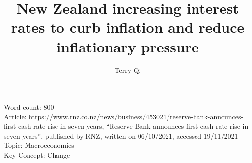 \documentclass[a4paper,12pt]{article}
\title{New Zealand increasing interest rates to curb inflation and reduce inflationary pressure}
\author{Terry Qi}
\newcommand{\comment}[1]{}
\begin{document}
\maketitle

Word count: 800\\
Article: https://www.rnz.co.nz/news/business/453021/reserve-bank-announces-first-cash-rate-rise-in-seven-years, ``Reserve Bank announces first cash rate rise in seven years'', published by RNZ, written on 06/10/2021, accessed 19/11/2021\\
Topic: Macroeconomics\\
Key Concept: Change

\newpage

\comment{
\section*{Article}

\textit{Reserve Bank announces first cash rate rise in seven years}

The Reserve Bank (RBNZ) has ignored the Covid-19 outbreak and raised the official cash rate (OCR) for the first time in seven years to head off growing inflation pressures.

It raised the OCR by a quarter of a percentage point to 0.5 percent, as expected, because of strongly rising prices, a hot housing market, and tight labour market.

The RBNZ's Monetary Policy Committee said the rise was justified even though the economy was likely to take a sharp hit from the current outbreak and lockdowns.

"The current COVID-19-related restrictions have not materially changed the medium-term outlook for inflation and employment since the August Statement."

It said household and business activity has been strong going into the shutdown and it was expected to rebound as it had previously.

"Ongoing fiscal policy support, and a strong terms of trade provide confidence that economic activity will recover quickly as alert level restrictions ease. Recent economic indicators support this picture," the committee said in a statement.

The RBNZ had been expected to raise rates in August, but decided at the last minute to keep rates unchanged because of the Covid uncertainty.

It acknowledged some businesses would be "badly affected" by the lockdowns but decided it needed to act to meet its target of maximum employment and inflation anchored around 2 percent.

}
\end{document}
